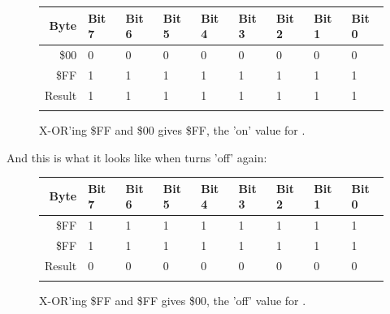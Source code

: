 \begin{figure}[H]
  {
    \setlength{\tabcolsep}{3.0pt}
    \setlength\cmidrulewidth{\heavyrulewidth} %
    \begin{adjustbox}{width=7cm,center}

      \begin{tabular}{rllllllll}
        \toprule
        Byte & Bit 7 & Bit 6 & Bit 5 & Bit 4 & Bit 3 & Bit 2 & Bit 1 & Bit 0        \\
        \midrule
        \$00 & 0 & 0 & 0 & 0 & 0 & 0 & 0 & 0 \\
        \$FF & 1 & 1 & 1 & 1 & 1 & 1 & 1 & 1 \\
        \midrule
        Result & 1 & 1 & 1 & 1 & 1 & 1 & 1 & 1 \\
        \addlinespace
        \bottomrule
      \end{tabular}

    \end{adjustbox}

  }\caption*{X-OR'ing \$FF and \$00 gives \$FF, the 'on' value for .}
\end{figure}

And this is what it looks like when  turns  'off' again:
\begin{figure}[H]
  {
    \setlength{\tabcolsep}{3.0pt}
    \setlength\cmidrulewidth{\heavyrulewidth} %
    \begin{adjustbox}{width=7cm,center}

      \begin{tabular}{rllllllll}
        \toprule
        Byte & Bit 7 & Bit 6 & Bit 5 & Bit 4 & Bit 3 & Bit 2 & Bit 1 & Bit 0        \\
        \midrule
        \$FF & 1 & 1 & 1 & 1 & 1 & 1 & 1 & 1 \\
        \$FF & 1 & 1 & 1 & 1 & 1 & 1 & 1 & 1 \\
        \midrule
        Result & 0 & 0 & 0 & 0 & 0 & 0 & 0 & 0 \\
        \addlinespace
        \bottomrule
      \end{tabular}

    \end{adjustbox}

  }\caption*{X-OR'ing \$FF and \$FF gives \$00, the 'off' value for .}
\end{figure}
\clearpage

